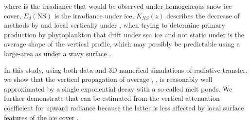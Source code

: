 \DIFaddbegin \noindent \DIFaddend where \edzero{} is the irradiance that would be observed under homogeneous snow \DIFdelbegin \DIFdel{/}\DIFdelend \DIFaddbegin {}\DIFaddend ice cover, $E_d(\text{NS})$ is the irradiance under ice, \DIFaddbegin {}\DIFaddend $K_{NS}(z)$ describes the \DIFdelbegin {}\DIFdelend decrease of \edzero{} \DIFdelbegin {}\DIFdelend \DIFaddbegin {}\DIFaddend methods by \citet{Frey2011} and \citet{Laney2017} \DIFdelbegin {}\DIFdelend \DIFaddbegin {}\DIFaddend local \edz{} vertically under \DIFdelbegin {}\DIFdelend \DIFaddbegin {}\ked{} \DIFaddend , when trying to determine primary production by phytoplankton that drift under sea ice and \DIFdelbegin {}\DIFdelend \DIFaddbegin {}\DIFaddend not static under \DIFdelbegin {}\DIFdelend \DIFaddbegin {}\DIFaddend is the average shape of the vertical \edz{} profile, which may possibly be predictable using a large-area \meanked{} as under a wavy \DIFdelbegin {}\DIFdelend \DIFaddbegin {}\DIFaddend surface \citep{Zaneveld2001}. 

In this study, using both \DIFdelbegin {}\DIFdelend \DIFaddbegin {}\DIFaddend data and 3D \DIFdelbegin {}\DIFdelend \DIFaddbegin {}\DIFaddend numerical simulations of radiative transfer, we show that the vertical propagation of average \edz{}, \meanedz{}, is reasonably well approximated by a single exponential decay with a so-called \DIFdelbegin {}\DIFdelend \DIFaddbegin {}\ked{}\DIFadd{, }\DIFaddend \meanked{}\DIFdelbegin {}\DIFdelend \DIFaddbegin {}\DIFaddend melt ponds. We further demonstrate that \DIFdelbegin {}\DIFdelend \meanked{} can be estimated from \DIFdelbegin {}\DIFdelend the vertical attenuation coefficient for upward radiance \DIFaddbegin \DIFadd{(}\DIFaddend \klu{}\DIFdelbegin \DIFdel{, }\DIFdelend \DIFaddbegin \DIFadd{) }\DIFaddend because the latter is \DIFdelbegin {}\DIFdelend \DIFaddbegin {}\DIFaddend less affected by local surface features of the ice cover\DIFaddbegin {}\meanedz{}\klu{} \meanedz{} \DIFaddend .